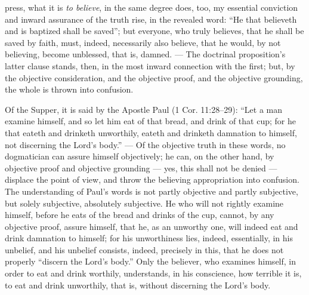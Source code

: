\documentclass[12pt]{book}
\begin{document}
press, what it is \emph{to believe}, in the same degree does, too, my essential conviction and inward assurance of the truth rise, in the revealed word: ``He that believeth and is baptized shall be saved''; but everyone, who truly believes, that he shall be saved by faith, must, indeed, necessarily also believe, that he would, by not believing, become unblessed, that is, damned. --- The doctrinal proposition's latter clause stands, then, in the most inward connection with the first; but, by the objective consideration, and the objective proof, and the objective grounding, the whole is thrown into confusion.

Of the Supper, it is said by the Apostle Paul (1 Cor. 11:28--29): ``Let a man examine himself, and so let him eat of that bread, and drink of that cup; for he that eateth and drinketh unworthily, eateth and drinketh damnation to himself, not discerning the Lord's body.'' --- Of the objective truth in these words, no dogmatician can assure himself objectively; he can, on the other hand, by objective proof and objective grounding --- yes, this shall not be denied --- displace the point of view, and throw the believing appropriation into confusion. The understanding of Paul's words is not partly objective and partly subjective, but solely subjective, absolutely subjective. He who will not rightly examine himself, before he eats of the bread and drinks of the cup, cannot, by any objective proof, assure himself, that he, as an unworthy one, will indeed eat and drink damnation to himself; for his unworthiness lies, indeed, essentially, in his unbelief, and his
unbelief consists, indeed, precisely in this, that he does not properly ``discern the Lord's body.'' Only the believer, who examines himself, in order to eat and drink worthily, understands, in his conscience, how terrible it is, to eat and drink unworthily, that is, without discerning the Lord's body.
\end{document}
